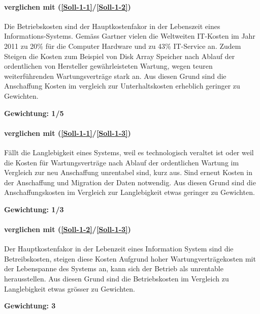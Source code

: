 \paragraph*{ verglichen mit  (\ref{Soll-1-1}/\ref{Soll-1-2})}
Die Betriebskosten sind der Hauptkostenfakor in der Lebenszeit eines Informations-Systems. Gemäss Gartner vielen die Weltweiten IT-Kosten im Jahr 2011 zu 20\% für die Computer Hardware und zu 43\% IT-Service an. Zudem Steigen die Kosten zum Beispiel von Disk Array Speicher nach Ablauf der ordentlichen von Hersteller gewährleisteten Wartung, wegen teuren weiterführenden Wartungsverträge stark an.
Aus diesen Grund sind die Anschaffung Kosten im vergleich zur Unterhaltskosten erheblich geringer zu Gewichten.

\textbf{Gewichtung: 1/5}

\paragraph*{ verglichen mit  (\ref{Soll-1-1}/\ref{Soll-1-3})}
Fällt die Langlebigkeit eines Systems, weil es technologisch veraltet ist oder weil die Kosten für Wartungsverträge nach Ablauf der ordentlichen Wartung im Vergleich zur neu Anschaffung unrentabel sind, kurz aus. Sind erneut Kosten in der Anschaffung und Migration der Daten notwendig. Aus diesen Grund sind die Anschaffungskosten im Vergleich zur Langlebigkeit etwas geringer zu Gewichten.

\textbf{Gewichtung: 1/3}


\paragraph*{ verglichen mit  (\ref{Soll-1-2}/\ref{Soll-1-3})}
Der Hauptkostenfakor in der Lebenzeit eines Information System sind die Betreibskosten, steigen diese Kosten Aufgrund hoher Wartungverträgekosten mit der Lebenspanne des Systems an, kann sich der Betrieb als unrentable herausstellen. Aus diesen Grund sind die Betriebskosten im Vergleich zu Langlebigkeit etwas grösser zu Gewichten.

\textbf{Gewichtung: 3}


